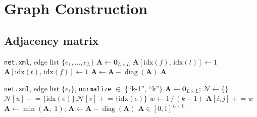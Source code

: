 \documentclass[11pt]{article}
\begin{document}
\section{Graph Construction}

\subsection{Adjacency matrix}

\begin{algorithm}[H]
\caption{Adjacency from SUMO connections (driving connectivity)}
\begin{algorithmic}[1]
\Require \texttt{net.xml}, edge list $\{e_1,\dots,e_L\}$
\State $\mathbf{A} \gets \mathbf{0}_{L\times L}$
        \State $\mathbf{A}[\mathrm{idx}(f),\, \mathrm{idx}(t)] \gets 1$
        \State $\mathbf{A}[\mathrm{idx}(t),\, \mathrm{idx}(f)] \gets 1$ 
    \EndIf
\EndFor
\State $\mathbf{A} \gets \mathbf{A} - \operatorname{diag}(\mathbf{A})$ 
\State \Return $\mathbf{A}$
\end{algorithmic}
\end{algorithm}

\begin{algorithm}[H]
\caption{Adjacency by shared junction node (weighted)}
\begin{algorithmic}[1]
\Require \texttt{net.xml}, edge list $\{e_\ell\}$, \texttt{normalize} $\in$ \{``k-1'', ``k''\}
\State $\mathbf{A} \gets \mathbf{0}_{L\times L}$; \quad $\mathcal{N} \gets \{\}$
    \State $\mathcal{N}[u] \mathrel{+}= \{\mathrm{idx}(e)\}$;\quad $\mathcal{N}[v] \mathrel{+}= \{\mathrm{idx}(e)\}$
\EndFor
{}
    \State $w \gets 1\,/\,(k-1)$ 
        \State $\mathbf{A}[i,j] \mathrel{+}= w$
    \EndFor
\EndFor
\State $\mathbf{A} \gets \min(\mathbf{A},\; 1)$; \quad $\mathbf{A} \gets \mathbf{A} - \operatorname{diag}(\mathbf{A})$
\State \Return $\mathbf{A} \in [0,1]^{L\times L}$
\end{algorithmic}
\end{algorithm}
\end{document}
